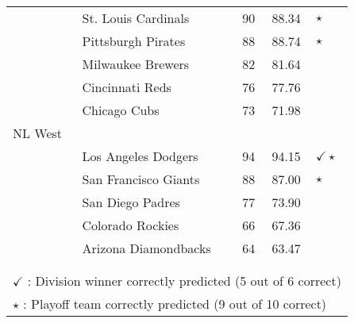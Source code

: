 \documentclass{article} %
\begin{document}
\begin{table}[h!]
\begin{center}
\begin{tabular}{llccl}
& St. Louis Cardinals & 90 & 88.34 & $\star $\\
& Pittsburgh Pirates & 88 & 88.74 & $\star $\\
& Milwaukee Brewers & 82 & 81.64 & \\
& Cincinnati Reds & 76 & 77.76 & \\
& Chicago Cubs & 73 & 71.98 & \\
NL West & & & & \\
& Los Angeles Dodgers & 94 & 94.15 & $\checkmark 	\star $ \\
& San Francisco Giants & 88 & 87.00 & $\star $\\
& San Diego Padres & 77 & 73.90 & \\
& Colorado Rockies & 66 & 67.36 & \\
& Arizona Diamondbacks & 64 & 63.47 & \\
\\ \hline \\
\multicolumn{5}{l}{ $\checkmark$ : Division winner correctly predicted (5 out of 6 correct) } \\
\multicolumn{5}{l}{ $\star$ : Playoff team correctly predicted (9 out of 10 correct) } \\

\end{tabular}
\end{center}
\end{table}
\end{document}
